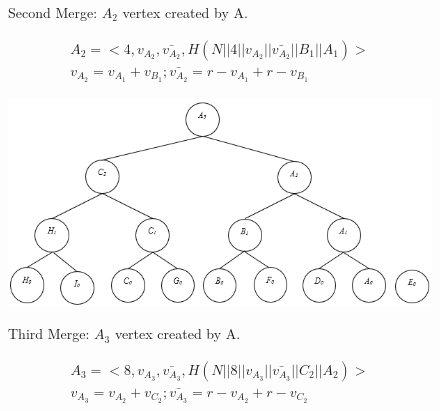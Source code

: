 \begin{exmp}
\begin{figure}[h!]
					\caption{Second Merge: $A_{2}$ vertex created by A.}
					\label{fig:commitment-tree-example-3-shia}
				\end{figure}
				\begin{equation}
					\begin{array}{l}
						A_{2} = <4, v_{A_{2}},\bar{v_{A_{2}}},H(N || 4 || v_{A_{2}} || \bar{v_{A_{2}}} || B_{1} ||A_{1}) >\\
						v_{A_{2}} = v_{A_{1}} + v_{B_{1}}; \bar{v_{A_{2}}} = r - v_{A_{1}} + r - v_{B_{1}}
					\end{array}
				\end{equation}
				\begin{figure}[h!]
					\centering
					\includegraphics[scale = 1]{images/commitment-tree-example-4-shia.png}\\
					\caption{Third Merge: $A_{3}$ vertex created by A.}
					\label{fig:commitment-tree-example-4-shia}
				\end{figure}
				\begin{equation}
					\begin{array}{l}
						A_{3} = <8, v_{A_{3}},\bar{v_{A_{3}}},H(N || 8 || v_{A_{3}} || \bar{v_{A_{3}}} || C_{2} ||A_{2}) >\\
						v_{A_{3}} = v_{A_{2}} + v_{C_{2}}; \bar{v_{A_{3}}} = r - v_{A_{2}} + r - v_{C_{2}}
					\end{array}
				\end{equation}
			\end{exmp}

